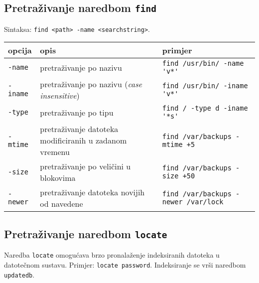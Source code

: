 \subsection*{Pretraživanje naredbom \texttt{find}}
Sintaksa: \texttt{find <path> -name <searchstring>}.
\begin{center}
 
\begin{tabularx}{\textwidth}{lXl}
\toprule
opcija & opis & primjer\\
\midrule
\texttt{-name} &pretraživanje po nazivu&\lstinline!find /usr/bin/ -name 'v*'!\\ \addlinespace
\texttt{-iname} &pretraživanje po nazivu (\textit{case insensitive}) &\lstinline!find /usr/bin/ -iname 'v*'!\\ \addlinespace
\texttt{-type} &pretraživanje po tipu&\lstinline!find / -type d -iname '*s'!\\  \addlinespace
\texttt{-mtime} &pretraživanje datoteka modificiranih u zadanom vremenu&\lstinline!find /var/backups -mtime +5!\\ \addlinespace
\texttt{-size} &pretraživanje po veličini u blokovima&\lstinline!find /var/backups -size +50!\\ \addlinespace
\texttt{-newer} &pretraživanje datoteka novijih od navedene&\lstinline!find /var/backups -newer /var/lock!\\ 
\bottomrule
\end{tabularx}

\end{center}

\subsection*{Pretraživanje naredbom \texttt{locate}}

Naredba \texttt{locate} omogućava brzo pronalaženje indeksiranih datoteka u datotečnom sustavu. Primjer: \lstinline!locate password!. Indeksiranje se vrši naredbom \lstinline!updatedb!.

